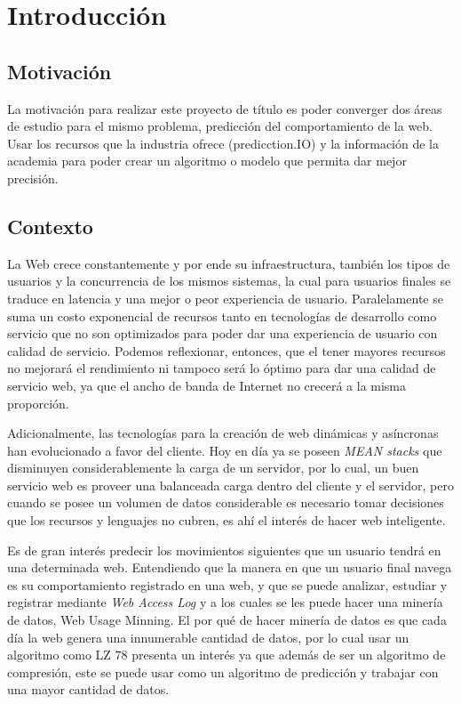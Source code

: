 \chapter[Introducción]{Introducción}
\label{ch:intro}

\section{Motivación}
\label{sec:motivacion}

La motivación para realizar este proyecto de título es poder converger dos áreas de estudio para el mismo problema, predicción del comportamiento de la web. Usar los recursos que la industria ofrece (predicction.IO) y la información de la academia para poder crear un algoritmo o modelo que permita dar mejor precisión.

\section{Contexto}
\label{sec:contexto}

  La Web crece constantemente y por ende su infraestructura, también los tipos de usuarios y  la concurrencia de los mismos sistemas, la cual para usuarios finales se traduce en latencia y una mejor o peor experiencia de usuario. 
  Paralelamente se suma un costo exponencial de recursos tanto en tecnologías de desarrollo como servicio que no son optimizados para poder dar una experiencia de usuario con calidad de servicio. Podemos reflexionar, entonces, que el tener mayores recursos no mejorará el rendimiento ni tampoco será lo óptimo para dar una calidad de servicio web, ya que el ancho de banda de Internet no crecerá a la misma proporción.
   
  Adicionalmente, las tecnologías para la creación de web dinámicas y asíncronas han evolucionado a favor del cliente.
  Hoy en día ya se poseen \emph{MEAN stacks} que disminuyen considerablemente la carga de un servidor, por lo cual, un buen servicio web es proveer una balanceada carga dentro del cliente y el servidor, pero cuando se posee un volumen de datos considerable es necesario tomar decisiones que los recursos y lenguajes no cubren, es ahí el interés de hacer  web inteligente.

  Es de gran interés predecir los movimientos siguientes que un usuario tendrá en una determinada web.
  Entendiendo que la manera en que un usuario final navega es su comportamiento registrado en una web, y que se puede analizar, estudiar y registrar mediante \emph{Web Access Log} y a los cuales se les puede hacer una minería de datos, Web Usage Minning. El por qué de hacer minería de datos es que cada día la web genera una innumerable cantidad de datos, por lo cual usar un algoritmo como LZ 78 presenta un interés ya que además de ser un algoritmo de compresión, este se puede usar como un algoritmo de predicción y trabajar con una mayor cantidad de datos.
  
